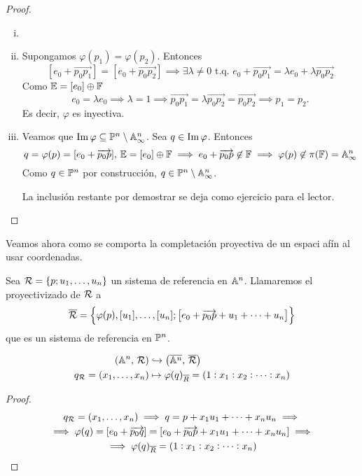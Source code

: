 \begin{proof}
  \begin{enumerate}[i)]
    \item[]
    \item Supongamos $\varphi(p_1) = \varphi(p_2)$. Entonces
    \[
      [e_0 + \overrightarrow{p_0p_1}] = [e_0+\overrightarrow{p_0p_2}]
      \implies \exists \lambda \neq 0 \text{ t.q. } e_0 + \overrightarrow{p_0p_1}
      = \lambda e_0 + \lambda \overrightarrow{p_0p_2}
    \]
    Como $\mathbb{E} = [e_0] \oplus \mathbb{F}$
    \[e_0 = \lambda e_0 \implies \lambda = 1 \implies \overrightarrow{p_0p_1}
    = \lambda \overrightarrow{p_0p_2} = \overrightarrow{p_0p_2} \implies
    p_1 = p_2.\]
    Es decir, $\varphi$ es inyectiva.
    \item Veamos que $\operatorname{Im} \varphi \subseteq \mathbb{P}^n \setminus \mathbb{A}^n_\infty$. Sea
    $q \in \operatorname{Im} \varphi$. Entonces
    \[
      q = \varphi(p) = [e_0+\overrightarrow{p_0p}], \, \mathbb{E} = [e_0] \oplus \mathbb{F}
      \implies e_0 + \overrightarrow{p_0p} \not \in \mathbb{F} \implies
      \varphi(p) \not \in \pi(\mathbb{F}) = \mathbb{A}^n_\infty
    \]
    Como $q \in \mathbb{P}^n$ por construcción, $q \in \mathbb{P}^n \setminus \mathbb{A}^n_\infty$.
    
    La inclusión restante por demostrar se deja como ejercicio para el lector.
  \end{enumerate}
\end{proof}

Veamos ahora como se comporta la completación proyectiva de un espaci afín
al usar coordenadas.

\begin{defi}
  Sea $\mathcal{R} = \left \{p;u_1, \dots, u_n \right \}$ un sistema de referencia en
  $\mathbb{A}^n$. Llamaremos el proyectivizado de $\mathcal{R}$ a
  \[
    \overline{\mathcal{R}} = \left \{ \varphi(p), [u_1], \dots, [u_n] ; 
    \left[ e_0 + \overrightarrow{p_0p} + u_1 + \dots + u_n \right] \right \}
  \]
  que es un sistema de referencia en $\mathbb{P}^n$.
\end{defi}

\begin{prop}  
  \[
    \begin{aligned}
      \left( \mathbb{A}^n, \, \mathcal{R} \right) &\hookrightarrow \bigl( \overline{\mathbb{A}^n}, \, \overline{\mathcal{R}} 
      \bigr) \\
      q_{\mathcal{R}} = \left( x_1, \dots, x_n \right) &\mapsto \varphi(q)_{\overline{R}} = \left(
      1 : x_1 : x_2 : \dots : x_n \right)
    \end{aligned}  
  \]
\end{prop}

\begin{proof}
  \begin{gather*}
    q_{\mathcal{R}} = \left( x_1, \dots, x_n \right) \implies q = p + x_1u_1 + \dots + x_nu_n \implies \\
    \implies \varphi(q) = [e_0 + \overrightarrow{p_0q}] = [e_0+\overrightarrow{p_0p}
    + x_1u_1 + \dots + x_nu_n]\implies\\
    \implies \varphi(q)_{\overline{R}} = \left( 1 : x_1 : x_2 : \dots : x_n \right)
  \end{gather*}
\end{proof}

